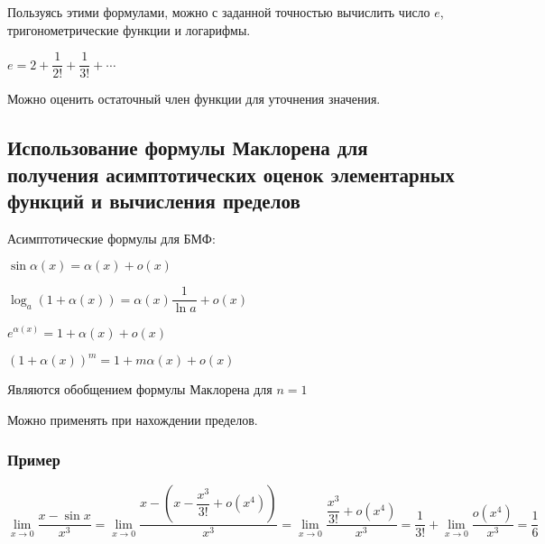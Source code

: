 Пользуясь этими формулами, можно с заданной точностью вычислить число $ e $, тригонометрические функции и логарифмы.

$ e = 2 + \dfrac{1}{2!} + \dfrac{1}{3!} + \cdots $

Можно оценить остаточный член функции для уточнения значения.

\subsection{Использование формулы Маклорена для получения асимптотических оценок элементарных функций и вычисления пределов}

Асимптотические формулы для БМФ:

$\sin\alpha(x) = \alpha(x) + o(x)$

$\log_a(1+\alpha(x)) = \alpha(x)\dfrac{1}{\ln{a}} + o(x)$

$e^{\alpha(x)} = 1 + \alpha(x) + o(x)$

$(1+\alpha (x))^{m} =  1 + m\alpha(x) + o(x)$

Являются обобщением формулы Маклорена для $ n = 1 $

Можно применять при нахождении пределов.

\subsubsection{Пример}

$ \lim\limits_{x \to 0} \dfrac{x - \sin x}{x^{3}} =
\lim\limits_{x \to 0} \dfrac{x -  \left( x - \dfrac{x^{3}}{3!} + o(x^{4}) \right)  }{x^{3}} =
\lim\limits_{x \to 0} \dfrac{\dfrac{x^{3}}{3!} + o(x^{4}) }{x^{3}} =
\dfrac{1}{3!} + \lim\limits_{x \to 0} \dfrac{o(x^{4})}{x^{3}} =
\dfrac{1}{6}$

